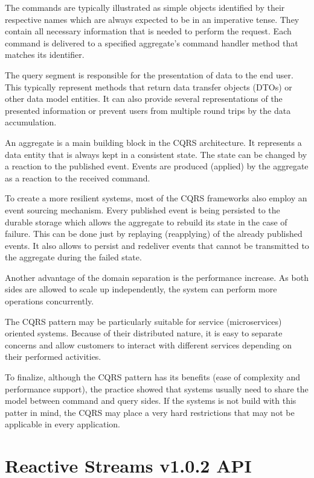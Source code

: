 \documentclass[oneside,
  digital, %
  table,   %
  lof,     %
  lot,     %
]{fithesis3}
\begin{document}
The commands are typically illustrated as simple objects identified by their respective names which are always expected to be in an imperative tense. They contain all necessary information that is needed to perform the request. Each command is delivered to a specified aggregate's command handler method that matches its identifier. 

The query segment is responsible for the presentation of data to the end user. This typically represent methods that return data transfer objects (DTOs) or other data model entities. It can also provide several representations of the presented information or prevent users from multiple round trips by the data accumulation.

An aggregate is a main building block in the CQRS architecture. It represents a data entity that is always kept in a consistent state. The state can be changed by a reaction to the published event. Events are produced (applied) by the aggregate as a reaction to the received command. 

To create a more resilient systems, most of the CQRS frameworks also employ an event sourcing mechanism. Every published event is being persisted to the durable storage which allows the aggregate to rebuild its state in the case of failure. This can be done just by replaying (reapplying) of the already published events. It also allows to persist and redeliver events that cannot be transmitted to the aggregate during the failed state.

Another advantage of the domain separation is the performance increase. As both sides are allowed to scale up independently, the system can perform more operations concurrently.

The CQRS pattern may be particularly suitable for service (microservices) oriented systems. Because of their distributed nature, it is easy to separate concerns and allow customers to interact with different services depending on their performed activities.

To finalize, although the CQRS pattern has its benefits (ease of complexity and performance support), the practice showed that systems usually need to share the model between command and query sides. If the systems is not build with this patter in mind, the CQRS may place a very hard restrictions that may not be applicable in every application.


\clearpage
\chapter{Reactive Streams v1.0.2 API}
\label{reactive_streams}
\end{document}
